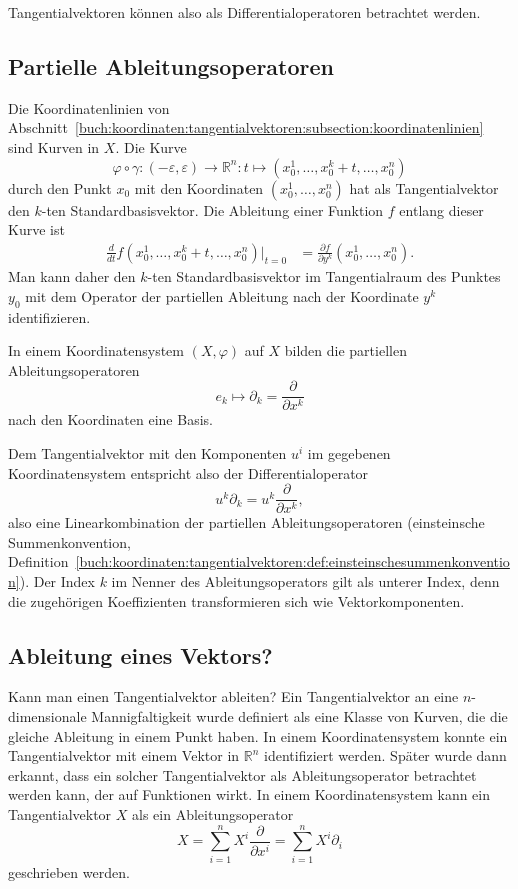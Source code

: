 Tangentialvektoren können also als Differentialoperatoren betrachtet
werden.

%
%
\subsection{Partielle Ableitungsoperatoren}
Die Koordinatenlinien von
Abschnitt~\ref{buch:koordinaten:tangentialvektoren:subsection:koordinatenlinien}
sind Kurven in $X$.
Die Kurve
\[
\varphi\circ\gamma
\colon
(-\varepsilon,\varepsilon)
\to
\mathbb{R}^n
:
t\mapsto (x_0^1,\dots,x_0^k+t,\dots,x_0^n)
\]
durch den Punkt $x_0$ mit den Koordinaten $(x_0^1,\dots,x_0^n)$
hat als Tangentialvektor den $k$-ten Standardbasisvektor.
Die Ableitung einer Funktion $f$ entlang dieser Kurve ist
\begin{align*}
\frac{d}{dt}
f(x_0^1,\dots,x_0^k+t,\dots,x_0^n)
\bigg|_{t=0}
&=
\frac{\partial f}{\partial y^k}(x_0^1,\dots,x_0^n).
\end{align*}
Man kann daher den $k$-ten Standardbasisvektor im Tangentialraum
des Punktes $y_0$ mit dem Operator der partiellen Ableitung nach
der Koordinate $y^k$ identifizieren.

\begin{satz}
In einem Koordinatensystem $(X,\varphi)$ auf $X$ bilden 
die partiellen Ableitungsoperatoren 
\[
e_k
\mapsto
\partial_k = \frac{\partial}{\partial x^k}
\]
nach den Koordinaten eine Basis.
\end{satz}

Dem Tangentialvektor mit den Komponenten $u^i$ im gegebenen
Koordinatensystem entspricht also der Differentialoperator
\[
u^k\partial_k = u^k\frac{\partial}{\partial x^k},
\]
also eine Linearkombination der partiellen Ableitungsoperatoren
(einsteinsche Summenkonvention, Definition~\ref{buch:koordinaten:tangentialvektoren:def:einsteinschesummenkonvention}).
Der Index $k$ im Nenner des Ableitungsoperators gilt als unterer
Index, denn die zugehörigen Koeffizienten transformieren sich
wie Vektorkomponenten.

%
%
\subsection{Ableitung eines Vektors?
\label{buch:koordinaten:diffop:subsection:vektorableitung}}
Kann man einen Tangentialvektor ableiten?
Ein Tangentialvektor an eine $n$-dimensionale Mannigfaltigkeit wurde
definiert als eine Klasse von Kurven, die die gleiche Ableitung in
einem Punkt haben.
In einem Koordinatensystem konnte ein Tangentialvektor mit einem
Vektor in $\mathbb{R}^n$ identifiziert werden.
Später wurde dann erkannt, dass ein solcher Tangentialvektor als
Ableitungsoperator betrachtet werden kann, der auf Funktionen
wirkt.
In einem Koordinatensystem kann ein Tangentialvektor $X$ als
ein Ableitungsoperator
\[
X
=
\sum_{i=1}^n
X^i \frac{\partial}{\partial x^i}
=
\sum_{i=1}^n
X^i \partial_i
\]
geschrieben werden.

